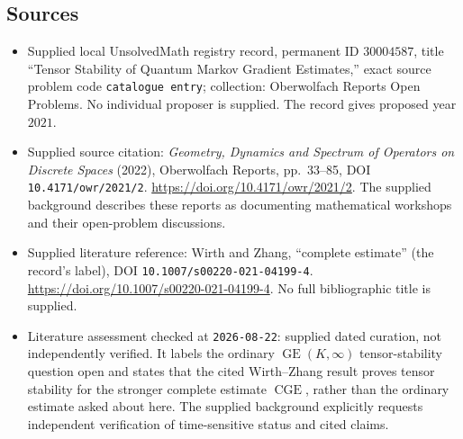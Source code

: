 \documentclass[11pt]{article}
\begin{document}
\subsection{Sources}
\begin{itemize}
\item Supplied local UnsolvedMath registry record, permanent ID \(30004587\), title ``Tensor Stability of Quantum Markov Gradient Estimates,'' exact source problem code \texttt{catalogue entry}; collection: Oberwolfach Reports Open Problems. No individual proposer is supplied. The record gives proposed year \(2021\).
\item Supplied source citation: \emph{Geometry, Dynamics and Spectrum of Operators on Discrete Spaces} (2022), Oberwolfach Reports, pp.\ 33--85, DOI \texttt{10.4171/owr/2021/2}. \url{https://doi.org/10.4171/owr/2021/2}. The supplied background describes these reports as documenting mathematical workshops and their open-problem discussions.
\item Supplied literature reference: Wirth and Zhang, ``complete estimate'' (the record's label), DOI \texttt{10.1007/s00220-021-04199-4}. \url{https://doi.org/10.1007/s00220-021-04199-4}. No full bibliographic title is supplied.
\item Literature assessment checked at \texttt{2026-08-22}: supplied dated curation, not independently verified. It labels the ordinary \(\operatorname{GE}(K,\infty)\) tensor-stability question open and states that the cited Wirth--Zhang result proves tensor stability for the stronger complete estimate \(\operatorname{CGE}\), rather than the ordinary estimate asked about here. The supplied background explicitly requests independent verification of time-sensitive status and cited claims.
\end{itemize}
\end{document}
